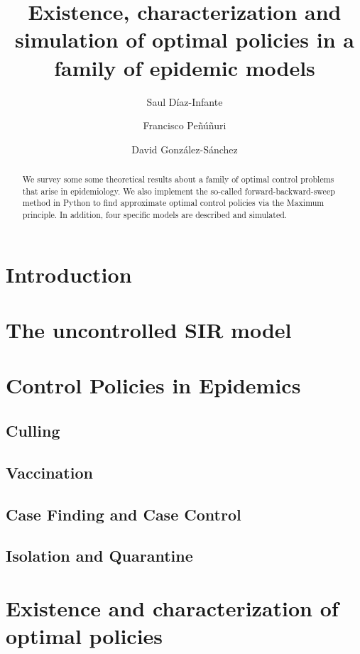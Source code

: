 \documentclass[titlepage]{amsart}
\title[%
	Existence, characterization and simulation of optimal policies in a family of epidemic 
	models%
	]{
	Existence, characterization and simulation of optimal policies in a family of epidemic 
  models
}
\author[S. D\'iaz-Infante]{Saul D\'iaz-Infante}
\author[F. Pe\~nu\~n\'{u}ri]{Francisco Pe\~n\'u\~nuri}
\author[D. Gonz\'alez-S\'anchez]{David Gonz\'alez-S\'anchez}
\begin{document}
\maketitle	
  \begin{abstract}
  	We survey some some theoretical results about a family of optimal control problems that arise in epidemiology. We also implement the so-called forward-backward-sweep method in Python to find approximate optimal control policies via the Maximum principle. In addition, four specific models are described and simulated.  
  \end{abstract}
  
%

  \section{Introduction}
    
  \section{The uncontrolled SIR model}
    
  \section{Control Policies in Epidemics}
    
    \subsection{Culling}
      
    \subsection{Vaccination}
      
    \subsection{Case Finding and Case Control}
      
    \subsection{Isolation and Quarantine}
      
%
  \section{Existence and characterization of optimal policies}
    
%
%
\end{document}

